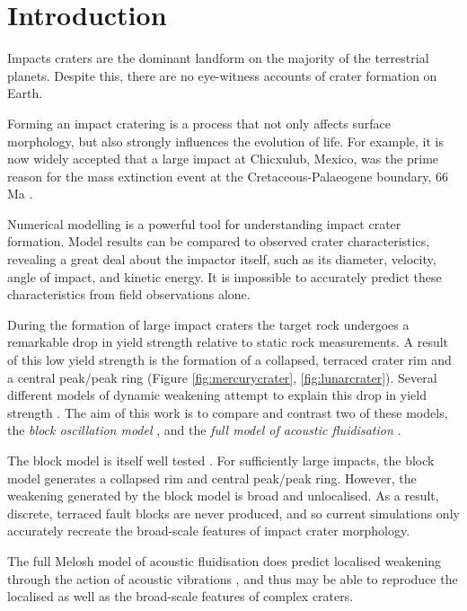 \newpage
\section{Introduction}


Impacts craters are the dominant landform on the majority of the terrestrial planets. Despite this, there are no eye-witness accounts of crater formation on Earth. 

Forming an impact cratering is a process that not only affects surface morphology, but also strongly influences the evolution of life. For example, it is now widely accepted that a large impact at Chicxulub, Mexico, was the prime reason for the mass extinction event at the Cretaceous-Palaeogene boundary, 66 Ma \citep{schulte2010chicxulub}.

Numerical modelling is a powerful tool for understanding impact crater formation. Model results can be compared to observed crater characteristics, revealing a great deal about the impactor itself, such as its diameter, velocity, angle of impact, and kinetic energy. It is impossible to accurately predict these characteristics from field observations alone. 

During the formation of large impact craters the target rock undergoes a remarkable drop in yield strength relative to static rock measurements. A result of this low yield strength is the formation of a collapsed, terraced crater rim and a central peak/peak ring (Figure \ref{fig:mercurycrater}, \ref{fig:lunarcrater}). Several different models of dynamic weakening attempt to explain this drop in yield strength \citep{kenkmann2012modification}. The aim of this work is to compare and contrast two of these models, the \textit{block oscillation model} \citep{ivanov1997block}, and the \textit{full model of acoustic fluidisation} \citep{melosh1979acoustic}.

The block model is itself well tested \citetext{\citet{collins2002hydrocode} and \citet{morgan2000peak}, for example}. For sufficiently large impacts, the block model generates a collapsed rim and central peak/peak ring. However, the weakening generated by the block model is broad and unlocalised. As a result, discrete, terraced fault blocks are never produced, and so current simulations only accurately recreate the broad-scale features of impact crater morphology. 

The full Melosh model of acoustic fluidisation does predict localised weakening through the action of acoustic vibrations \citep{melosh1979acoustic}, and thus may be able to reproduce the localised as well as the broad-scale features of complex craters.

